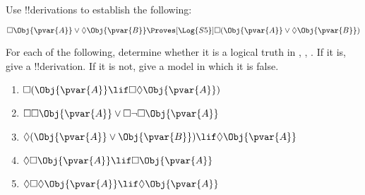 \documentclass[../../../include/open-logic-section]{subfiles}
\begin{document}
\begin{prob}
    \citep[exercise 3.2 item 3]{MacFarlane-2020-PhilosophicalLogicContemporary}
    Use !!{derivation}s to establish the following:

    $\Box\Obj{\pvar{A}}\lor\Diamond\Obj{\pvar{B}} \Proves[\Log{S5}] 
        \Box(\Obj{\pvar{A}}\lor\Diamond\Obj{\pvar{B}})$ 
\end{prob}

\begin{prob}
    \citep[exercise 3.2 item 4]{MacFarlane-2020-PhilosophicalLogicContemporary}
    For each of the following, determine whether it is a logical truth
    in , , . If it is, give a !!{derivation}.
    If it is not, give a model in which it is false.

    \begin{enumerate}
    \item $\Box(\Obj{\pvar{A}}\lif\Box\Diamond\Obj{\pvar{A}})$
    \item $\Box\Box\Obj{\pvar{A}}\lor\Box\lnot\Box\Obj{\pvar{A}}$
    \item $\Diamond(\Obj{\pvar{A}}\lor\Obj{\pvar{B}})\lif\Diamond\Obj{\pvar{A}}$
    \item $\Diamond\Box\Obj{\pvar{A}}\lif\Box{\Obj{\pvar{A}}}$
    \item $\Diamond\Box\Diamond{\Obj{\pvar{A}}}\lif\Diamond{\Obj{\pvar{A}}}$
    \end{enumerate}

\end{prob}
\end{document}
